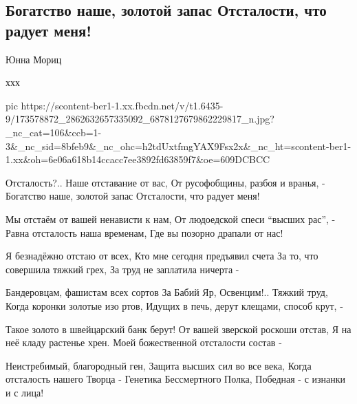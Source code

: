  
 
 
 
 

\subsection{Богатство наше, золотой запас Отсталости, что радует меня!}

Юнна Мориц

ххх

\ifcmt
  pic https://scontent-ber1-1.xx.fbcdn.net/v/t1.6435-9/173578872_2862632657335092_6878127679862229817_n.jpg?_nc_cat=106&ccb=1-3&_nc_sid=8bfeb9&_nc_ohc=h2tdUxtfmgYAX9Fsx2x&_nc_ht=scontent-ber1-1.xx&oh=6e06a618b14ccacc7ee3892fd63859f7&oe=609DCBCC
\fi

Отсталость?.. Наше отставание от вас,
От русофобщины, разбоя и вранья, -
Богатство наше, золотой запас
Отсталости, что радует меня!

Мы отстаём от вашей ненависти к нам,
От людоедской спеси \enquote{высших рас}, -
Равна отсталость наша временам,
Где вы позорно драпали от нас!

Я безнадёжно отстаю от всех,
Кто мне сегодня предъявил счета
За то, что совершила тяжкий грех, 
За труд не заплатила ничерта -

Бандеровцам, фашистам всех сортов
За Бабий Яр, Освенцим!.. Тяжкий труд,
Когда коронки золотые изо ртов,
Идущих в печь, дерут клещами, способ крут, -

Такое золото в швейцарский банк берут!
От вашей зверской роскоши отстав,
Я на неё кладу растенье хрен.
Моей божественной отсталости состав -

Неистребимый, благородный ген,
Защита высших сил во все века,
Когда отсталость нашего Творца -
Генетика Бессмертного Полка,
Победная - с изнанки и с лица!
